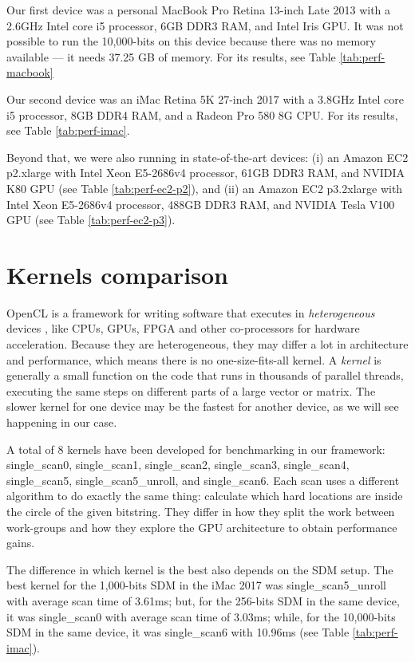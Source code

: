 Our first device was a personal MacBook Pro Retina 13-inch Late 2013 with a 2.6GHz Intel core i5 processor, 6GB DDR3 RAM, and Intel Iris GPU. It was not possible to run the 10,000-bits on this device because there was no memory available --- it needs 37.25 GB of memory. For its results, see Table \ref{tab:perf-macbook}

Our second device was an iMac Retina 5K 27-inch 2017 with a 3.8GHz Intel core i5 processor, 8GB DDR4 RAM, and a Radeon Pro 580 8G CPU. For its results, see Table \ref{tab:perf-imac}.

Beyond that, we were also running in state-of-the-art devices: (i) an Amazon EC2 p2.xlarge with Intel Xeon E5-2686v4 processor, 61GB DDR3 RAM, and NVIDIA K80 GPU (see Table \ref{tab:perf-ec2-p2}), and (ii) an Amazon EC2 p3.2xlarge with Intel Xeon E5-2686v4 processor, 488GB DDR3 RAM, and NVIDIA Tesla V100 GPU (see Table \ref{tab:perf-ec2-p3}).


\section{Kernels comparison}

OpenCL is a framework for writing software that executes in \emph{heterogeneous} devices \citep{munshi2009opencl}, like CPUs, GPUs, FPGA and other co-processors for hardware acceleration. Because they are heterogeneous, they may differ a lot in architecture and performance, which means there is no one-size-fits-all kernel. A \emph{kernel} is generally a small function on the code that runs in thousands of parallel threads, executing the same steps on different parts of a large vector or matrix. The slower kernel for one device may be the fastest for another device, as we will see happening in our case.

A total of 8 kernels have been developed for benchmarking in our framework: single\_scan0, single\_scan1, single\_scan2, single\_scan3, single\_scan4, single\_scan5, single\_scan5\_unroll, and single\_scan6. Each scan uses a different algorithm to do exactly the same thing: calculate which hard locations are inside the circle of the given bitstring. They differ in how they split the work between work-groups and how they explore the GPU architecture to obtain performance gains.

The difference in which kernel is the best also depends on the SDM setup. The best kernel for the 1,000-bits SDM in the iMac 2017 was single\_scan5\_unroll with average scan time of 3.61ms; but, for the 256-bits SDM in the same device, it was single\_scan0 with average scan time of 3.03ms; while, for the 10,000-bits SDM in the same device, it was single\_scan6 with 10.96ms (see Table \ref{tab:perf-imac}).

